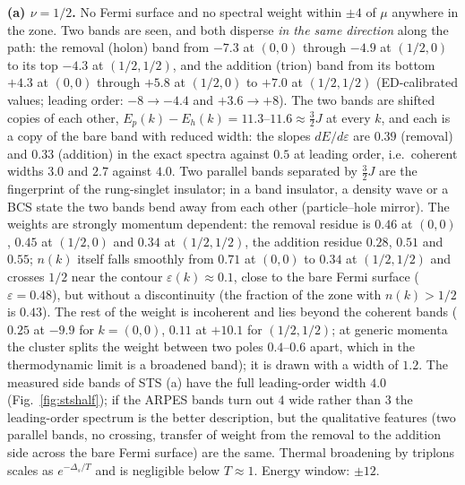 \documentclass[11pt]{article}
\newcommand{\nuh}{\nu=1/2}
\begin{document}
\textbf{(a) $\nuh$.} No Fermi surface and no spectral weight within $\pm4$ of $\mu$ anywhere in the zone. Two bands are seen, and both disperse \emph{in the same direction} along the path: the removal (holon) band from $-7.3$ at $(0,0)$ through $-4.9$ at $(1/2,0)$ to its top $-4.3$ at $(1/2,1/2)$, and the addition (trion) band from its bottom $+4.3$ at $(0,0)$ through $+5.8$ at $(1/2,0)$ to $+7.0$ at $(1/2,1/2)$ (ED-calibrated values; leading order: $-8\to-4.4$ and $+3.6\to+8$). The two bands are shifted copies of each other, $E_p(k)-E_h(k)=11.3$--$11.6\approx\tfrac32J$ at every $k$, and each is a copy of the bare band with reduced width: the slopes $dE/d\varepsilon$ are $0.39$ (removal) and $0.33$ (addition) in the exact spectra against $0.5$ at leading order, i.e.\ coherent widths $3.0$ and $2.7$ against $4.0$. Two parallel bands separated by $\tfrac32J$ are the fingerprint of the rung-singlet insulator; in a band insulator, a density wave or a BCS state the two bands bend away from each other (particle--hole mirror). The weights are strongly momentum dependent: the removal residue is $0.46$ at $(0,0)$, $0.45$ at $(1/2,0)$ and $0.34$ at $(1/2,1/2)$, the addition residue $0.28$, $0.51$ and $0.55$; $n(k)$ itself falls smoothly from $0.71$ at $(0,0)$ to $0.34$ at $(1/2,1/2)$ and crosses $1/2$ near the contour $\varepsilon(k)\approx0.1$, close to the bare Fermi surface ($\varepsilon=0.48$), but without a discontinuity (the fraction of the zone with $n(k)>1/2$ is $0.43$). The rest of the weight is incoherent and lies beyond the coherent bands ($0.25$ at $-9.9$ for $k=(0,0)$, $0.11$ at $+10.1$ for $(1/2,1/2)$; at generic momenta the cluster splits the weight between two poles $0.4$--$0.6$ apart, which in the thermodynamic limit is a broadened band); it is drawn with a width of $1.2$. The measured side bands of STS (a) have the full leading-order width $4.0$ (Fig.~\ref{fig:stshalf}); if the ARPES bands turn out $4$ wide rather than $3$ the leading-order spectrum is the better description, but the qualitative features (two parallel bands, no crossing, transfer of weight from the removal to the addition side across the bare Fermi surface) are the same. Thermal broadening by triplons scales as $e^{-\Delta_s/T}$ and is negligible below $T\approx1$. Energy window: $\pm12$.
\end{document}
